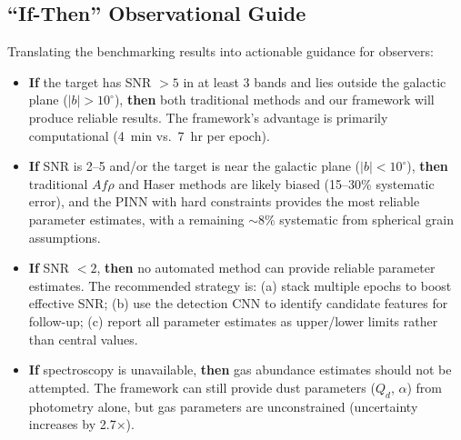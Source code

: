 \documentclass[usenatbib]{mnras}
\begin{document}
\subsection{``If-Then'' Observational Guide}\label{sec:ifthen}

Translating the benchmarking results into actionable guidance for observers:

\begin{itemize}
    \item \textbf{If} the target has SNR $>5$ in at least 3 bands and lies outside the galactic plane ($|b| > 10^\circ$), \textbf{then} both traditional methods and our framework will produce reliable results. The framework's advantage is primarily computational (4~min vs.\ 7~hr per epoch).

    \item \textbf{If} SNR is 2--5 and/or the target is near the galactic plane ($|b| < 10^\circ$), \textbf{then} traditional $Af\rho$ and Haser methods are likely biased (15--30\% systematic error), and the PINN with hard constraints provides the most reliable parameter estimates, with a remaining $\sim$8\% systematic from spherical grain assumptions.

    \item \textbf{If} SNR $<2$, \textbf{then} no automated method can provide reliable parameter estimates. The recommended strategy is: (a) stack multiple epochs to boost effective SNR; (b) use the detection CNN to identify candidate features for follow-up; (c) report all parameter estimates as upper/lower limits rather than central values.

    \item \textbf{If} spectroscopy is unavailable, \textbf{then} gas abundance estimates should not be attempted. The framework can still provide dust parameters ($Q_d$, $\alpha$) from photometry alone, but gas parameters are unconstrained (uncertainty increases by 2.7$\times$).


\end{itemize}
\end{document}
